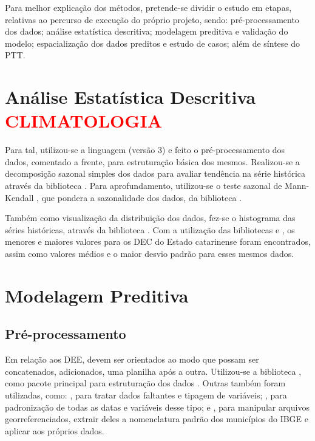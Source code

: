 \indent Para melhor explicação dos métodos, pretende-se dividir o estudo em etapas, relativas ao percurso de execução do próprio projeto, sendo: pré-processamento dos dados; análise estatística descritiva; modelagem preditiva e validação do modelo; espacialização dos dados preditos e estudo de casos; além de síntese do \acrfull{PTT}.

\section{Análise Estatística Descritiva \textcolor{red}{CLIMATOLOGIA}}

\indent Para tal, utilizou-se a linguagem  (versão 3) \cite{python3_2009_van} e feito o pré-processamento dos dados, comentado a frente, para estruturação básica dos mesmos. Realizou-se a decomposição sazonal simples dos dados para avaliar tendência na série histórica através da biblioteca  \cite{statsmodels_2010_seabold}. Para aprofundamento, utilizou-se o teste sazonal de Mann-Kendall , que pondera a sazonalidade dos dados, da biblioteca  \cite{pyMannKendall_2019_Hussain}.

\indent Também como visualização da distribuição dos dados, fez-se o histograma das séries históricas, através da biblioteca  \cite{matplotlib_2007_hunter}. Com a utilização das bibliotecas  \cite{pandas_2010_scipy, pandas_2020_reback} e  \cite{numpy_2020_harrisarray}, os menores e maiores valores para os \acrshort{DEC} do Estado catarinense foram encontrados, assim como valores médios e o maior desvio padrão para esses mesmos dados.

\section{Modelagem Preditiva}

\subsection{Pré-processamento}

Em relação aos \acrshort{DEE}, devem ser orientados ao modo que possam ser concatenados, adicionados, uma planilha após a outra. Utilizou-se a biblioteca , como pacote principal para estruturação dos dados . Outras também foram utilizadas, como: , para tratar dados faltantes e tipagem de variáveis;  \cite{python2_1995_van}, para padronização de todas as datas e variáveis desse tipo; e  \cite{geopandas_2020_kelseyjordahl}, para manipular arquivos georreferenciados, extrair deles a nomenclatura padrão dos municípios do \acrshort{IBGE} e aplicar aos próprios dados.

